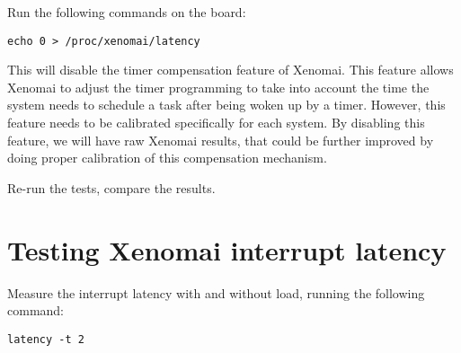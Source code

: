 Run the following commands on the board:

\begin{verbatim}
echo 0 > /proc/xenomai/latency
\end{verbatim}

This will disable the timer compensation feature of Xenomai. This
feature allows Xenomai to adjust the timer programming to take into
account the time the system needs to schedule a task after being woken
up by a timer. However, this feature needs to be calibrated
specifically for each system. By disabling this feature, we will have
raw Xenomai results, that could be further improved by doing proper
calibration of this compensation mechanism.

Re-run the tests, compare the results.

\section{Testing Xenomai interrupt latency}

Measure the interrupt latency with and without load, running the
following command:

\begin{verbatim}
latency -t 2
\end{verbatim}
